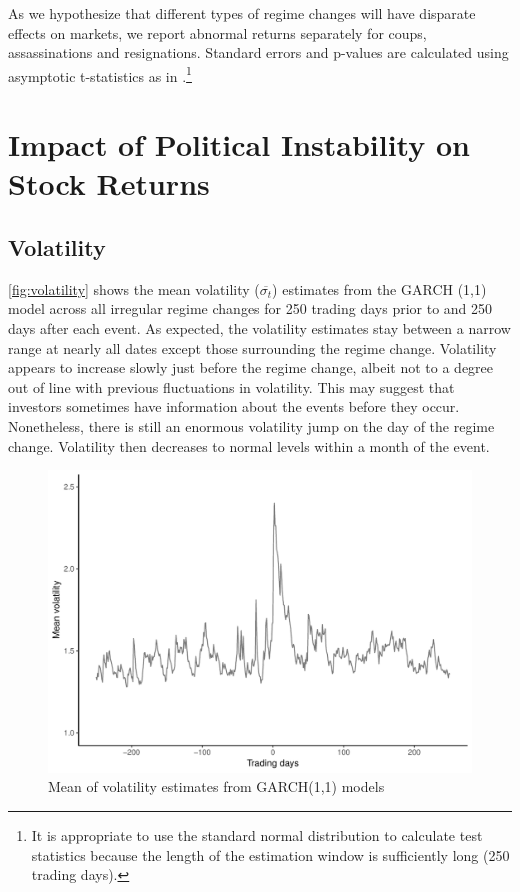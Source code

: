 \documentclass[12pt,final,fleqn]{article}
\theoremstyle{plain}
\begin{document}
As we hypothesize that different types of regime changes will have disparate effects on markets, we report abnormal returns separately for coups, assassinations and resignations. Standard errors and p-values are calculated using asymptotic t-statistics as in \citet{mackinlay1997event}.\footnote{It is appropriate to use the standard normal distribution to calculate test statistics because the length of the estimation window is sufficiently long (250 trading days).} 


\section{Impact of Political Instability on Stock Returns} \label{sec: Impact of Political Instability on Stock Returns}

\subsection{Volatility} \label{subsec: Volatility}


\autoref{fig:volatility} shows the mean volatility ($\overline{\sigma_t}$) estimates from the GARCH (1,1) model across all irregular regime changes for 250 trading days prior to and 250 days after each event. As expected, the volatility estimates stay between a narrow range at nearly all dates except those surrounding the regime change. Volatility appears to increase slowly just before the regime change, albeit not to a degree out of line with previous fluctuations in volatility. This may suggest that investors sometimes have information about the events before they occur. Nonetheless, there is still an enormous volatility jump on the day of the regime change. Volatility then decreases to normal levels within a month of the event.

\begin{figure}[!htb]
\includegraphics[scale = 0.9]{../figs/mean-volatility.pdf}
\caption{Mean of volatility estimates from GARCH(1,1) models}
\label{fig:volatility}
\end{figure}
\end{document}
